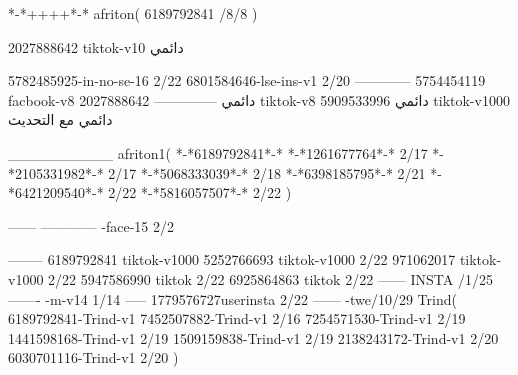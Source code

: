 *-*++++*-*
afriton(
6189792841 /8/8
)

2027888642 tiktok-v10
دائمي

5782485925-in-no-se-16 2/22
6801584646-lse-ins-v1 2/20
------------
5754454119 facbook-v8
دائمي
--------------
2027888642 tiktok-v8
دائمي
5909533996 tiktok-v1000
دائمي مع التحديث

__________
afriton1(
*-*6189792841*-*
*-*1261677764*-* 2/17
*-*2105331982*-* 2/17
*-*5068333039*-* 2/18
*-*6398185795*-* 2/21
*-*6421209540*-* 2/22
*-*5816057507*-* 2/22
)

------
------------
-face-15 2/2

--------
6189792841 tiktok-v1000
5252766693 tiktok-v1000 2/22
971062017 tiktok-v1000 2/22
5947586990 tiktok 2/22
6925864863 tiktok 2/22
------
 INSTA /1/25
-------
-m-v14 1/14
-----
1779576727userinsta 2/22
------
-twe/10/29
Trind(
6189792841-Trind-v1 
7452507882-Trind-v1 2/16
7254571530-Trind-v1 2/19
1441598168-Trind-v1 2/19
1509159838-Trind-v1 2/19
2138243172-Trind-v1 2/20
6030701116-Trind-v1 2/20
)
